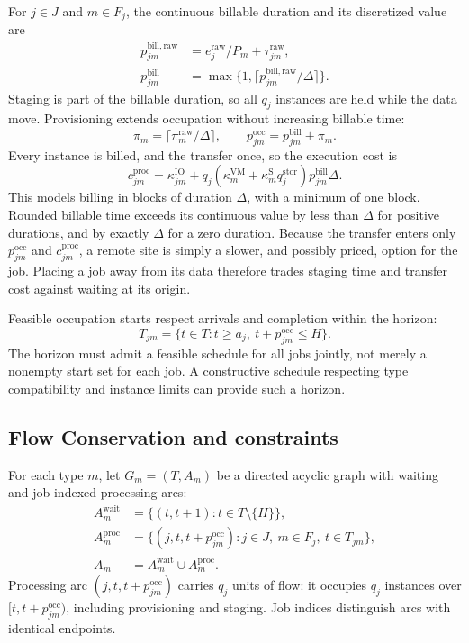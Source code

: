 \documentclass[conference]{IEEEtran}
\begin{document}
For $j\in J$ and $m\in F_j$, the continuous billable duration and its discretized value are
\begin{align}
 p_{jm}^{\mathrm{bill,raw}}
 &=e_j^{\mathrm{raw}}/P_m+\tau_{jm}^{\mathrm{raw}},\\
 p_{jm}^{\mathrm{bill}}
 &=\max\{1,\lceil p_{jm}^{\mathrm{bill,raw}}/\Delta\rceil\}.
\end{align}
Staging is part of the billable duration, so all $q_j$ instances are held while the data move. Provisioning extends occupation without increasing billable time:
\begin{equation}
 \pi_m=\lceil\pi_m^{\mathrm{raw}}/\Delta\rceil,
 \qquad p_{jm}^{\mathrm{occ}}=p_{jm}^{\mathrm{bill}}+\pi_m.
\end{equation}
Every instance is billed, and the transfer once, so the execution cost is
\begin{equation}
 c_{jm}^{\mathrm{proc}}=\kappa_{jm}^{\mathrm{IO}}+
 q_j(\kappa_m^{\mathrm{VM}}+\kappa_m^{\mathrm{S}}q_j^{\mathrm{stor}})
 p_{jm}^{\mathrm{bill}}\Delta.
\end{equation}
This models billing in blocks of duration $\Delta$, with a minimum of one block. Rounded billable time exceeds its continuous value by less than $\Delta$ for positive durations, and by exactly $\Delta$ for a zero duration. Because the transfer enters only $p_{jm}^{\mathrm{occ}}$ and $c_{jm}^{\mathrm{proc}}$, a remote site is simply a slower, and possibly priced, option for the job. Placing a job away from its data therefore trades staging time and transfer cost against waiting at its origin.

Feasible occupation starts respect arrivals and completion within the horizon:
\begin{equation}
 T_{jm}=\{t\in T:t\geq a_j,\ t+p_{jm}^{\mathrm{occ}}\leq H\}.
\end{equation}
The horizon must admit a feasible schedule for all jobs jointly, not merely a nonempty start set for each job. A constructive schedule respecting type compatibility and instance limits can provide such a horizon.

\subsection{Flow Conservation and constraints}

For each type $m$, let $G_m=(T,A_m)$ be a directed acyclic graph with waiting and job-indexed processing arcs:
\begin{align}
 A_m^{\mathrm{wait}}&=\{(t,t+1):t\in T\setminus\{H\}\},\\
 A_m^{\mathrm{proc}}&=\{(j,t,t+p_{jm}^{\mathrm{occ}}):
 j\in J,\ m\in F_j,\ t\in T_{jm}\},\\
 A_m&=A_m^{\mathrm{wait}}\cup A_m^{\mathrm{proc}}.
\end{align}
Processing arc $(j,t,t+p_{jm}^{\mathrm{occ}})$ carries $q_j$ units of flow: it occupies $q_j$ instances over $[t,t+p_{jm}^{\mathrm{occ}})$, including provisioning and staging. Job indices distinguish arcs with identical endpoints.
\end{document}
